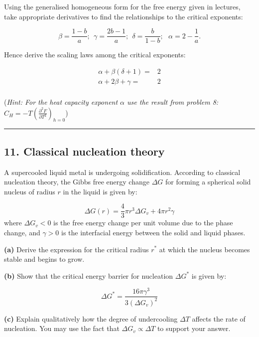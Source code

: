 \documentclass[
  letterpaper,
  DIV=11,
  numbers=noendperiod]{scrreprt}
\begin{document}
Using the generalised homogeneous form for the free energy given in
lectures, take appropriate derivatives to find the relationships to the
critical exponents:

\[
\beta=\frac{1-b}{a}; ~~ \gamma=\frac{2b-1}{a};~~ \delta= \frac{b}{1-b}; ~~~ \alpha=2-\frac{1}{a}.
\]

Hence derive the scaling laws among the critical exponents:

\begin{align*}
\alpha+\beta(\delta+1)=& 2 \\
\alpha+2\beta+\gamma =& 2\\
\end{align*}

(\emph{Hint: For the heat capacity exponent \(\alpha\) use the result
from problem 8:
\(C_H=-T\left(\frac{\partial^2F}{\partial T^2}\right)_{h=0}\)})

\begin{center}\rule{0.5\linewidth}{0.5pt}\end{center}

\subsection*{11. Classical nucleation
theory}\label{classical-nucleation-theory}

A supercooled liquid metal is undergoing solidification. According to
classical nucleation theory, the Gibbs free energy change \(\Delta G\)
for forming a spherical solid nucleus of radius \(r\) in the liquid is
given by:

\[
\Delta G(r) = \frac{4}{3}\pi r^3 \Delta G_v + 4\pi r^2 \gamma
\] where \(\Delta G_v < 0\) is the free energy change per unit volume
due to the phase change, and \(\gamma > 0\) is the interfacial energy
between the solid and liquid phases.

\textbf{(a)} Derive the expression for the critical radius \(r^*\) at
which the nucleus becomes stable and begins to grow.

\textbf{(b)} Show that the critical energy barrier for nucleation
\(\Delta G^*\) is given by:

\[
\Delta G^* = \frac{16\pi \gamma^3}{3 (\Delta G_v)^2}
\]

\textbf{(c)} Explain qualitatively how the degree of undercooling
\(\Delta T\) affects the rate of nucleation. You may use the fact that
\(\Delta G_v \propto \Delta T\) to support your answer.
\end{document}
